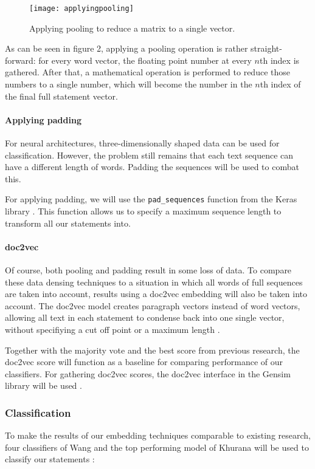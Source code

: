 \begin{figure}[h]
    \centering
    \texttt{[image: applyingpooling]}
    \caption{Applying pooling to reduce a matrix to a single vector.}
\end{figure}

As can be seen in figure 2, applying a pooling operation is rather straight-forward: for every word vector, the floating point number at every $n$th index is gathered.
After that, a mathematical operation is performed to reduce those numbers to a single number, which will become the number in the $n$th index of the final full statement vector.

\paragraph{Applying padding}
For neural architectures, three-dimensionally shaped data can be used for classification. 
However, the problem still remains that each text sequence can have a different length of words. 
Padding the sequences will be used to combat this.

For applying padding, we will use the \texttt{pad\_sequences} function from the Keras library \cite{keraspad}. 
This function allows us to specify a maximum sequence length to transform all our statements into.

\paragraph{doc2vec}
Of course, both pooling and padding result in some loss of data.
To compare these data densing techniques to a situation in which all words of full sequences are taken into account, results using a doc2vec embedding will also be taken into account.
The doc2vec model creates paragraph vectors instead of word vectors, allowing all text in each statement to condense back into one single vector, without specifiying a cut off point or a maximum length \cite{le2014}.

Together with the majority vote and the best score from previous research, the doc2vec score will function as a baseline for comparing performance of our classifiers.
For gathering doc2vec scores, the doc2vec interface in the Gensim library will be used \cite{gensim}. 

\subsubsection{Classification}
To make the results of our embedding techniques comparable to existing research, four classifiers of Wang and the top performing model of Khurana will be used to classify our statements \cite{wang2018,khurana2017}:

